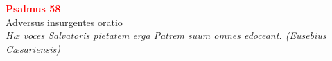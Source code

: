 


\def\greinitialformat#1{%
{\fontsize{39}{39}\selectfont #1}%
}




\vspace{0.3cm}
\begin{center}
 \textcolor{red}{\large \bf Psalmus 58}\\
Adversus insurgentes oratio\\
\textit{\small Hæ voces Salvatoris pietatem erga Patrem suum omnes edoceant. (Eusebius Cæsariensis)}
\end{center}
